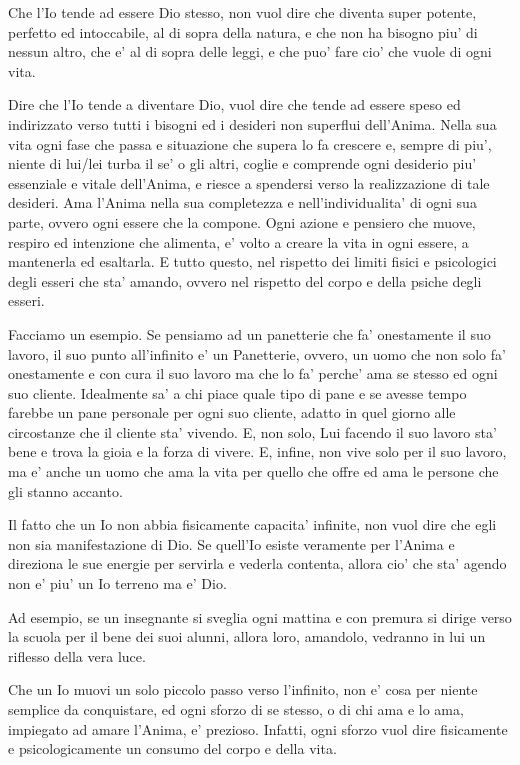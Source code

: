 Che l'Io tende ad essere Dio stesso, non vuol dire che diventa super potente, perfetto ed intoccabile, al di sopra della natura, e che non ha bisogno piu' di nessun altro, che e' al di sopra delle leggi, e che puo' fare cio' che vuole di ogni vita. 

Dire che l'Io tende a diventare Dio, vuol dire che tende ad essere speso ed indirizzato verso tutti i bisogni ed i desideri non superflui dell'Anima. Nella sua vita ogni fase che passa e situazione che supera lo fa crescere e, sempre di piu', niente di lui/lei turba il se' o gli altri, coglie e comprende ogni desiderio piu' essenziale e vitale dell'Anima, e riesce a spendersi verso la realizzazione di tale desideri. Ama l'Anima nella sua completezza e nell'individualita' di ogni sua parte, ovvero ogni essere che la compone. Ogni azione e pensiero che muove, respiro ed intenzione che alimenta, e' volto a creare la vita in ogni essere, a mantenerla ed esaltarla. E tutto questo, nel rispetto dei limiti fisici e psicologici degli esseri che sta' amando, ovvero nel rispetto del corpo e della psiche degli esseri.

Facciamo un esempio. Se pensiamo ad un panetterie che fa' onestamente il suo lavoro, il suo punto all'infinito e' un Panetterie, ovvero, un uomo che non solo fa' onestamente e con cura il suo lavoro ma che lo fa' perche' ama se stesso ed ogni suo cliente. Idealmente sa' a chi piace quale tipo di pane e se avesse tempo farebbe un pane personale per ogni suo cliente, adatto in quel giorno alle circostanze che il cliente sta' vivendo. E, non solo, Lui facendo il suo lavoro sta' bene e trova la gioia e la forza di vivere. E, infine, non vive solo per il suo lavoro, ma e' anche un uomo che ama la vita per quello che offre ed ama le persone che gli stanno accanto.

Il fatto che un Io non abbia fisicamente capacita' infinite, non vuol dire che egli non sia manifestazione di Dio. Se quell'Io esiste veramente per l'Anima e direziona le sue energie per servirla e vederla contenta, allora cio' che sta' agendo non e' piu' un Io terreno ma e' Dio.

Ad esempio, se un insegnante si sveglia ogni mattina e con premura si dirige verso la scuola per il bene dei suoi alunni, allora loro, amandolo, vedranno in lui un riflesso della vera luce.

Che un Io muovi un solo piccolo passo verso l'infinito, non e' cosa per niente semplice da conquistare, ed ogni sforzo di se stesso, o di chi ama e lo ama, impiegato ad amare l'Anima, e' prezioso. Infatti, ogni sforzo vuol dire fisicamente e psicologicamente un consumo del corpo e della vita.

